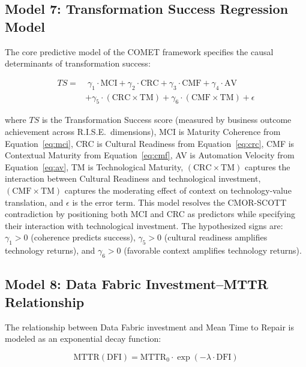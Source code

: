\documentclass[12pt,a4paper]{article}
\begin{document}
\subsection{Model 7: Transformation Success Regression Model}

The core predictive model of the COMET framework specifies the causal determinants of transformation success:

\begin{equation}
\begin{aligned}
TS = &\;\gamma_1 \cdot \text{MCI} + \gamma_2 \cdot \text{CRC} + \gamma_3 \cdot \text{CMF} + \gamma_4 \cdot \text{AV} \\
    &+ \gamma_5 \cdot (\text{CRC} \times \text{TM}) + \gamma_6 \cdot (\text{CMF} \times \text{TM}) + \epsilon
\end{aligned}
\label{eq:regression}
\end{equation}

\noindent where $TS$ is the Transformation Success score (measured by business outcome achievement across R.I.S.E.\ dimensions), MCI is Maturity Coherence from Equation~\eqref{eq:mci}, CRC is Cultural Readiness from Equation~\eqref{eq:crc}, CMF is Contextual Maturity from Equation~\eqref{eq:cmf}, AV is Automation Velocity from Equation~\eqref{eq:av}, TM is Technological Maturity, $(\text{CRC} \times \text{TM})$ captures the interaction between Cultural Readiness and technological investment, $(\text{CMF} \times \text{TM})$ captures the moderating effect of context on technology-value translation, and $\epsilon$ is the error term. This model resolves the CMOR-SCOTT contradiction by positioning both MCI and CRC as predictors while specifying their interaction with technological investment. The hypothesized signs are: $\gamma_1 > 0$ (coherence predicts success), $\gamma_5 > 0$ (cultural readiness amplifies technology returns), and $\gamma_6 > 0$ (favorable context amplifies technology returns).

\subsection{Model 8: Data Fabric Investment--MTTR Relationship}

The relationship between Data Fabric investment and Mean Time to Repair is modeled as an exponential decay function:

\begin{equation}
\text{MTTR}(\text{DFI}) = \text{MTTR}_0 \cdot \exp(-\lambda \cdot \text{DFI})
\label{eq:mttr}
\end{equation}
\end{document}
